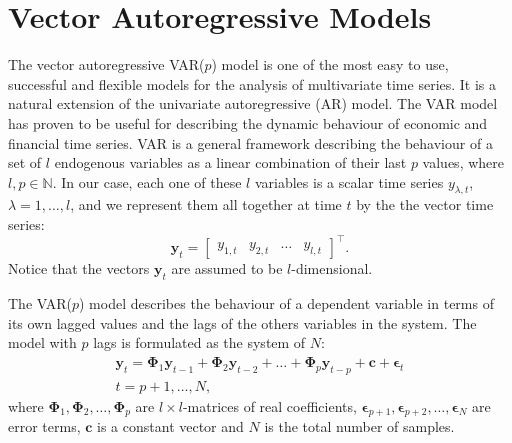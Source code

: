 \section{Vector Autoregressive Models}\label{sec:varvec}

The vector autoregressive VAR($p$) model is one of the most easy to use, successful and flexible models for the analysis of multivariate time series. It is a natural extension of the univariate autoregressive (AR) model. The VAR model has proven to be useful for describing the dynamic behaviour of economic and financial time series.
VAR is a general framework describing the behaviour of a
set of $l$ endogenous variables as a linear combination of their last $p$
values, where $l,p\in\mathbb{N}$. 
In our case, each one of these $l$ variables is a scalar time series
$y_{\lambda,t}$, $\lambda=1,\dots,l$, and we represent them all together
at time $t$ by the the vector time series:
\begin{equation}
\label{eq:variables}
\mathbf{y}_t = 
\begin{bmatrix} y_{1,t} & y_{2,t} & \dots & y_{l,t} \end{bmatrix}^\top.
\end{equation}
\noindent
Notice that the vectors $\mathbf{y}_t$ are assumed to be $l$-dimensional.

The VAR($p$) model describes the behaviour of a dependent variable in terms of
its own lagged values and the lags of the others variables in the system. The
model with $p$ lags is formulated as the system of $N$:
\begin{align}
\label{eq:var}
\mathbf{y}_t 
= \boldsymbol{\Phi}_1 \mathbf{y}_{t-1} +
  \boldsymbol{\Phi}_2 \mathbf{y}_{t-2} + \dots +
  \boldsymbol{\Phi}_p\mathbf{y}_{t-p} +
  \mathbf{c} + \boldsymbol{\epsilon}_t \nonumber \\
t=p+1,\dots,N,
\end{align}
\noindent where 
$\boldsymbol{\Phi}_1, \boldsymbol{\Phi}_2,\dots,\boldsymbol{\Phi}_p$
are $l\times l$-matrices of real coefficients,
$\boldsymbol{\epsilon}_{p+1},
 \boldsymbol{\epsilon}_{p+2}, \dots, \boldsymbol{\epsilon}_N$ 
are error terms, $\mathbf{c}$ is a constant vector and $N$ is the total
number of samples.

